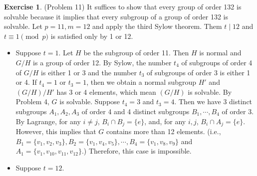 \documentclass[12pt, psamsfonts]{amsart}
\theoremstyle{definition}
\newtheorem*{exer}{Exercise}
\theoremstyle{remark}
\numberwithin{equation}{section}
\begin{document}
\begin{exer}{(Problem 11)}
  It suffices to show that every group of order 132 is solvable because it implies that every subgroup of a group of order 132 is solvable.
  Let $p = 11, m = 12$ and apply the third Sylow theorem.
  Them $t \mid 12$ and $t \equiv 1 \pmod p$ is satisfied only by 1 or 12.
  \begin{itemize}
    \item
      Suppose $t = 1$.
      Let $H$ be the subgroup of order 11.
      Then $H$ is normal and $G / H$ is a group of order 12.
      By Sylow, the number $t_4$ of subgroups of order 4 of $G / H$ is either 1 or 3 and the number $t_3$ of subgroups of order 3 is either 1 or 4.
      If $t_4 = 1$ or $t_3 = 1$, then we obtain a normal subgroup $H'$ and $(G / H) / H'$ has 3 or 4 elements, which mean $(G / H)$ is solvable.
      By Problem 4, $G$ is solvable.
      Suppose $t_4 = 3$ and $t_3 = 4$.
      Then we have 3 distinct subgroups $A_1, A_2, A_3$ of order 4 and 4 distinct subgroups $B_1, \cdots, B_4$ of order 3.
      By Lagrange, for any $i \ne j$, $B_i \cap B_j = \{ e \}$, and, for any $i, j$, $B_i \cap A_j = \{ e \}$.
      However, this implies that $G$ contains more than 12 elements.
      (i.e., $B_1 = \{ v_1, v_2, v_3 \}, B_2 = \{v_1, v_4, v_5 \}, \cdots, B_4 = \{ v_1, v_8, v_9 \}$ and $A_1 = \{ v_1, v_{10}, v_{11}, v_{12} \}$.)
      Therefore, this case is impossible.
    \item
      Suppose $t = 12$.
  \end{itemize}
\end{exer}
\end{document}
